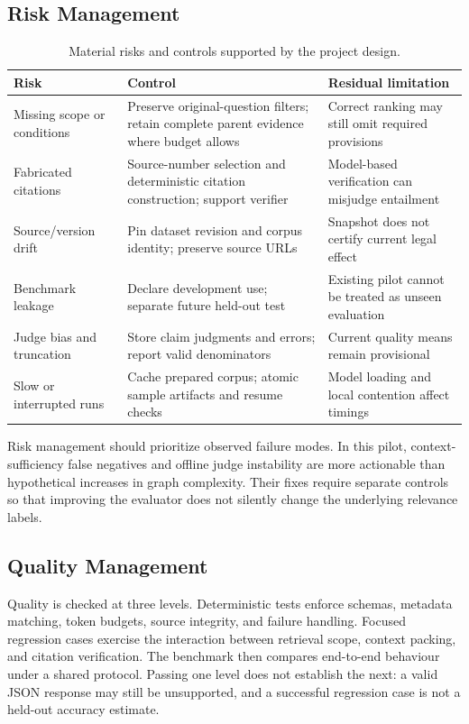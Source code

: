 \subsection{Risk Management}
\begin{table}[H]\centering\small
\caption{Material risks and controls supported by the project design.}\label{tab:risks}
\begin{tabularx}{\textwidth}{P{3.1cm}YY}\toprule
\textbf{Risk} & \textbf{Control} & \textbf{Residual limitation}\\\midrule
Missing scope or conditions & Preserve original-question filters; retain complete parent evidence where budget allows & Correct ranking may still omit required provisions\\
Fabricated citations & Source-number selection and deterministic citation construction; support verifier & Model-based verification can misjudge entailment\\
Source/version drift & Pin dataset revision and corpus identity; preserve source URLs & Snapshot does not certify current legal effect\\
Benchmark leakage & Declare development use; separate future held-out test & Existing pilot cannot be treated as unseen evaluation\\
Judge bias and truncation & Store claim judgments and errors; report valid denominators & Current quality means remain provisional\\
Slow or interrupted runs & Cache prepared corpus; atomic sample artifacts and resume checks & Model loading and local contention affect timings\\\bottomrule
\end{tabularx}
\end{table}
Risk management should prioritize observed failure modes. In this pilot, context-sufficiency false negatives and offline judge instability are more actionable than hypothetical increases in graph complexity. Their fixes require separate controls so that improving the evaluator does not silently change the underlying relevance labels.

\subsection{Quality Management}
Quality is checked at three levels. Deterministic tests enforce schemas, metadata matching, token budgets, source integrity, and failure handling. Focused regression cases exercise the interaction between retrieval scope, context packing, and citation verification. The benchmark then compares end-to-end behaviour under a shared protocol. Passing one level does not establish the next: a valid JSON response may still be unsupported, and a successful regression case is not a held-out accuracy estimate.


